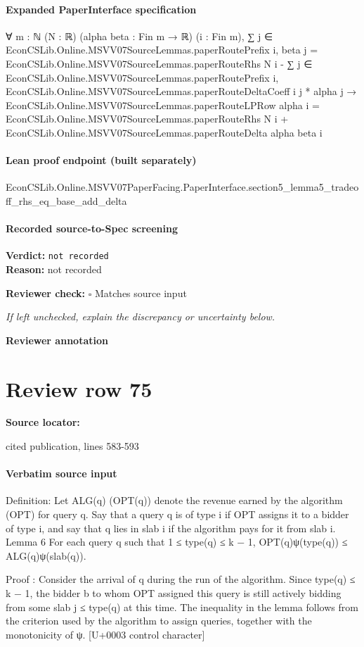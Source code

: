 \documentclass[10pt]{article}
\newcommand{\reviewerbox}{%
  \par\noindent\fbox{\parbox{0.96\linewidth}{\rule{0pt}{0.38in}}}\par
}
\newcommand{\reviewmatch}[1]{%
  \par\noindent\textbf{Reviewer check:} $\square$\; #1\par
  \noindent\emph{If left unchecked, explain the discrepancy or uncertainty below.}\par
}
\begin{document}
\paragraph{Expanded PaperInterface specification}
\begin{ReviewVerbatim}
∀ {m : ℕ} (N : ℝ) (alpha beta : Fin m → ℝ) (i : Fin m),
  ∑ j ∈ EconCSLib.Online.MSVV07SourceLemmas.paperRoutePrefix i, beta j =
      EconCSLib.Online.MSVV07SourceLemmas.paperRouteRhs N i -
        ∑ j ∈ EconCSLib.Online.MSVV07SourceLemmas.paperRoutePrefix i,
          EconCSLib.Online.MSVV07SourceLemmas.paperRouteDeltaCoeff i j * alpha j →
    EconCSLib.Online.MSVV07SourceLemmas.paperRouteLPRow alpha i =
      EconCSLib.Online.MSVV07SourceLemmas.paperRouteRhs N i +
        EconCSLib.Online.MSVV07SourceLemmas.paperRouteDelta alpha beta i
\end{ReviewVerbatim}

\paragraph{Lean proof endpoint (built separately)}\begin{ReviewVerbatim}
EconCSLib.Online.MSVV07PaperFacing.PaperInterface.section5_lemma5_tradeoff_rhs_eq_base_add_delta
\end{ReviewVerbatim}

\paragraph{Recorded source-to-Spec screening}
\textbf{Verdict:} \texttt{not recorded}
\\
\textbf{Reason:} not recorded
\reviewmatch{Matches source input}
\noindent\textbf{Reviewer annotation}\par
\reviewerbox
\clearpage
\hypertarget{source-claim-3058b7e00c451540}{}
\section*{Review row 75}
\textbf{Source locator:} {\footnotesize\raggedright cited publication, lines 583-\allowbreak{}593\par}
\paragraph{Verbatim source input}
\begin{ReviewVerbatim}
Definition: Let ALG(q) (OPT(q)) denote the revenue earned by the algorithm (OPT) for
query q. Say that a query q is of type i if OPT assigns it to a bidder of type i, and say that q
lies in slab i if the algorithm pays for it from slab i.
Lemma 6 For each query q such that 1 ≤ type(q) ≤ k − 1,
OPT(q)ψ(type(q)) ≤ ALG(q)ψ(slab(q)).

Proof : Consider the arrival of q during the run of the algorithm. Since type(q) ≤ k − 1, the
bidder b to whom OPT assigned this query is still actively bidding from some slab j ≤ type(q)
at this time. The inequality in the lemma follows from the criterion used by the algorithm to
assign queries, together with the monotonicity of ψ.
[U+0003 control character]
\end{ReviewVerbatim}
\end{document}

